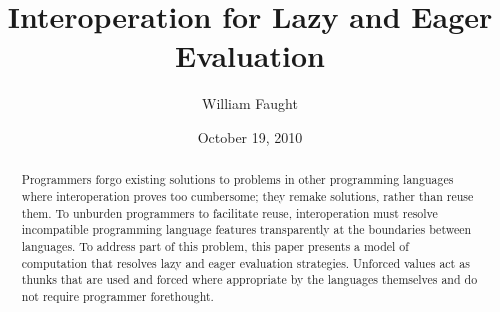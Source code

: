 \documentclass[12pt]{article}
\begin{document}
\title{Interoperation for Lazy and Eager Evaluation}
\author{William Faught}
\date{October 19, 2010}
\maketitle

\begin{abstract}
Programmers forgo existing solutions to problems in other programming languages where interoperation proves too cumbersome; they remake solutions, rather than reuse them. To unburden programmers to facilitate reuse, interoperation must resolve incompatible programming language features transparently at the boundaries between languages. To address part of this problem, this paper presents a model of computation that resolves lazy and eager evaluation strategies. Unforced values act as thunks that are used and forced where appropriate by the languages themselves and do not require programmer forethought.
\end{abstract}






\clearpage

\nocite{*}


\end{document}
